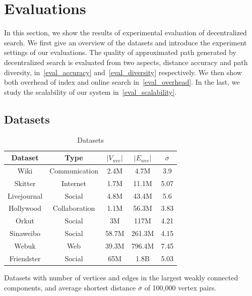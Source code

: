 \section{Evaluations}
\label{evaluation}

In this section, we show the results of experimental evaluation of decentralized search. We first give an overview of the datasets and introduce the experiment settings of our evaluations. The quality of approximated path generated by decentralized search is evaluated from two aspects, distance accuracy and path diversity, in~\ref{eval_accuracy} and~\ref{eval_diversity} respectively. We then show both overhead of index and online search in~\ref{eval_overhead}. In the last, we study the scalability of our system in~\ref{eval_scalability}.

\subsection{Datasets}
\label{eval_datasets}

\begin{table}
		\caption{Datasets}
		\vspace{2 mm}
		\label{table:datasets}
		\begin{threeparttable}
			\centering
			\begin{tabular}{c|cccc} \hline
				Dataset & Type & $|V_{wcc}|$ & $|E_{wcc}|$ & $\overline{\sigma}$ \\ \hline
				Wiki & Communication & 2.4M & 4.7M & 3.9 \\ 
				Skitter & Internet & 1.7M & 11.1M & 5.07 \\ 
				Livejournal & Social & 4.8M & 43.4M & 5.6 \\ 
				Hollywood & Collaboration & 1.1M & 56.3M & 3.83 \\ 
				Orkut & Social & 3M & 117M & 4.21 \\ 
				Sinaweibo & Social & 58.7M & 261.3M & 4.15 \\ 
				Webuk & Web & 39.3M & 796.4M & 7.45 \\ 
				Friendster & Social & 65M & 1.8B & 5.03 \\ \hline
			\end{tabular}
			\begin{tablenotes}
				\item Datasets with number of vertices and edges in the largest weakly connected components, and average shortest distance $\overline{\sigma}$ of 100,000 vertex pairs.
			\end{tablenotes}
		\end{threeparttable}
\end{table}

